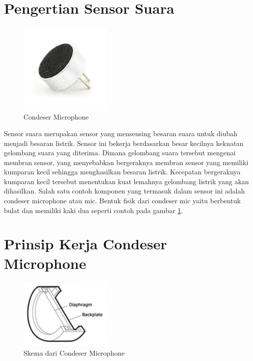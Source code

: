 

%


\section{Pengertian Sensor Suara}

\begin{figure}[ht]
\centerline{\includegraphics[width=0.4\textwidth]{figures/sscondesermic.jpg}}
\caption{Condeser Microphone}
\label{condesermic}
\end{figure}

Sensor suara merupakan sensor yang mensensing besaran suara untuk diubah menjadi besaran listrik. Sensor ini bekerja berdasarkan besar kecilnya kekuatan gelombang suara yang diterima. Dimana gelombang suara tersebut mengenai membran sensor, yang menyebabkan bergeraknya membran sensor yang memiliki kumparan kecil sehingga menghasilkan besaran listrik. Kecepatan bergeraknya kumparan kecil tersebut menentukan kuat lemahnya gelombang listrik yang akan dihasilkan. Salah satu contoh komponen yang termasuk dalam sensor ini adalah condeser microphone atau mic. Bentuk fisik dari condeser mic yaitu berbentuk bulat dan memiliki kaki dua seperti contoh pada gambar \ref{condesermic}.

\section{Prinsip Kerja Condeser Microphone}

\begin{figure}[ht]
\centerline{\includegraphics[width=0.4\textwidth]{figures/sscondesermicscheme.jpg}}
\caption{Skema dari Condeser Microphone}
\label{condesermicscheme}
\end{figure}

